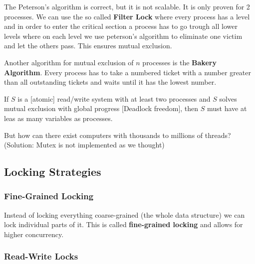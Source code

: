 \begin{remark}
    The Peterson's algorithm is correct, but it is not scalable. It is only proven for 2 processes. We can use the so called \textbf{Filter Lock} where every process has a level and in order to enter the critical section a process has to go trough all lower levels where on each level we use peterson's algorithm to eliminate one victim and let the others pass. This ensures mutual exclusion.
\end{remark}

\begin{remark}
    Another algorithm for mutual exclusion of $n$ processes is the \textbf{Bakery Algorithm}. Every process has to take a numbered ticket with a number greater than all outstanding tickets and waits until it has the lowest number.
\end{remark}

\begin{theorem}
    If $S$ is a [atomic] read/write system with at least two processes and $S$ solves mutual exclusion with global progress [Deadlock freedom], then $S$ must have at leas as many variables as processes.
\end{theorem}

\begin{remark}
    But how can there exist computers with thousands to millions of threads? (Solution: Mutex is not implemented as we thought)
\end{remark}


\subsection{Locking Strategies} 

\subsubsection{Fine-Grained Locking}

\begin{remark}
    Instead of locking everything coarse-grained (the whole data structure) we can lock individual parts of it. This is called \textbf{fine-grained locking} and allows for higher concurrency.
\end{remark}

\subsubsection{Read-Write Locks}

